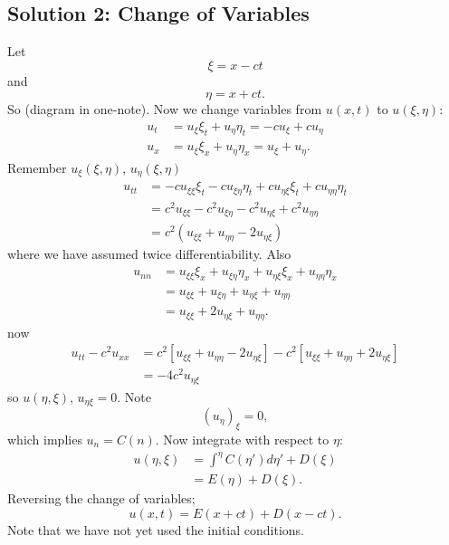 \documentclass{article}
\begin{document}
\subsection{Solution 2: Change of Variables}
Let $$\xi = x - ct$$ and $$\eta = x + ct.$$ So (diagram in one-note). Now we change variables from $u(x,t)$ to $u(\xi, \eta)$:
\begin{align*}
u_t &= u_{\xi} \xi_t + u_{\eta} \eta_t = -c u_{\xi} + cu_{\eta} \\
u_x &= u_{\xi} \xi_x + u_{\eta} \eta_x =  u_{\xi} + u_{\eta}.
\end{align*}
Remember $u_{\xi}(\xi,\eta)$, $u_{\eta}(\xi,\eta)$
\begin{align*}
u_{tt} &= -c u_{\xi\xi} \xi_t - cu_{\xi\eta}\eta_t + cu_{\eta\xi}\xi_t + cu_{\eta\eta}\eta_t \\
&= c^2 u_{\xi\xi} - c^2 u_{\xi \eta} - c^2u_{\eta \xi} + c^2u_{\eta \eta} \\
&= c^2( u_{\xi \xi} + u_{\eta \eta} - 2 u_{\eta \xi})
\end{align*}
where we have assumed twice differentiability. Also
\begin{align*}
u_{nn} &= u_{\xi \xi} \xi_x + u_{\xi \eta}\eta_x + u_{\eta \xi} \xi_x + u_{\eta \eta}\eta_x \\
&= u_{\xi \xi} + u_{\xi \eta} + u_{\eta \xi} + u_{\eta \eta} \\ 
&= u_{\xi \xi} + 2 u_{\eta \xi} + u_{\eta \eta}.
\end{align*}
now
\begin{align*}
u_{tt} - c^2u_{xx} &= c^2[u_{\xi\xi} + u_{\eta\eta} - 2 u_{\eta \xi}] - c^2[u_{\xi \xi} + u_{\eta \eta} + 2 u_{\eta \xi}] \\
&= -4 c^2 u_{\eta \xi}
\end{align*}
so $u(\eta, \xi)$, $u_{\eta \xi} = 0$.
Note
$$(u_{\eta})_{\xi} = 0,$$ which implies $u_n = C(n)$. Now integrate with respect to $\eta$:
\begin{align*}
u(\eta,\xi) &= \int^\eta C(\eta')d\eta' + D(\xi) \\
&= E(\eta) + D(\xi).
\end{align*}
Reversing the change of variables;
$$u(x,t) = E(x+ct) + D(x - ct).$$
Note that we have not yet used the initial conditions.
\end{document}
